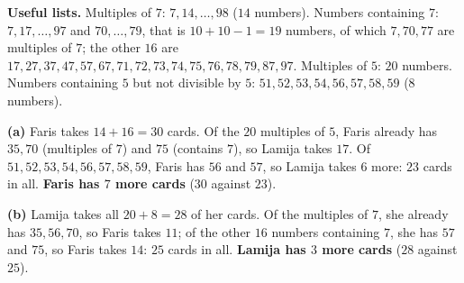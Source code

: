 \textbf{Useful lists.} Multiples of $7$: $7,14,\dots,98$ ($14$ numbers). Numbers containing $7$: $7,17,\dots,97$ and $70,\dots,79$, that is $10+10-1=19$ numbers, of which $7,70,77$ are multiples of $7$; the other $16$ are $17,27,37,47,57,67,71,72,73,74,75,76,78,79,87,97$. Multiples of $5$: $20$ numbers. Numbers containing $5$ but not divisible by $5$: $51,52,53,54,56,57,58,59$ ($8$ numbers).

\textbf{(a)} Faris takes $14+16=30$ cards. Of the $20$ multiples of $5$, Faris already has $35,70$ (multiples of $7$) and $75$ (contains $7$), so Lamija takes $17$. Of $51,52,53,54,56,57,58,59$, Faris has $56$ and $57$, so Lamija takes $6$ more: $23$ cards in all. \textbf{Faris has $\boxed{7}$ more cards} ($30$ against $23$).

\textbf{(b)} Lamija takes all $20+8=28$ of her cards. Of the multiples of $7$, she already has $35,56,70$, so Faris takes $11$; of the other $16$ numbers containing $7$, she has $57$ and $75$, so Faris takes $14$: $25$ cards in all. \textbf{Lamija has $\boxed{3}$ more cards} ($28$ against $25$).
